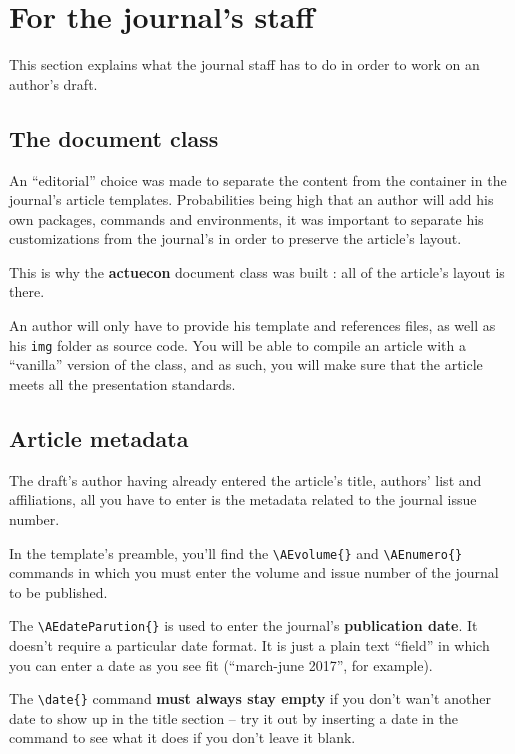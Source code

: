 \documentclass[english]{article}
\newcommand{\cmd}[1]{%
	\texttt{\textbackslash#1\{\}}
}
\begin{document}
	\section{For the journal's staff}
		\label{sec:personnel}
		
		This section explains what the journal staff has to do in order to work on an author's draft.
		
		\subsection{The document class}
		
			An ``editorial'' choice was made to separate the content from the container in the journal's
			article templates. Probabilities being high that an author will add his own packages, commands
			and environments, it was important to separate his customizations from the journal's in order
			to preserve the article's layout.
			
			This is why the \textbf{actuecon} document class was built : all of the article's layout is there.
			
			An author will only have to provide his template and references files, as well as his \texttt{img} folder
			as source code. You will be able to compile an article with a ``vanilla'' version of the class, and as such,
			you will make sure that the article meets all the presentation standards.
			
		\subsection{Article metadata}
		
			The draft's author having already entered the article's title, authors' list and affiliations, all you have
			to enter is the metadata related to the journal issue number.
			
			In the template's preamble, you'll find the \cmd{AEvolume} and \cmd{AEnumero} commands in which you must enter
			the volume and issue number of the journal to be published.
			
			The \cmd{AEdateParution} is used to enter the journal's \textbf{publication date}. It doesn't
			require a particular date format. It is just a plain text ``field'' in which you can enter a date as you see fit
			(``march-june 2017'', for example).
			
			The \cmd{date} command \textbf{must always stay empty} if you don't wan't another date to show up 
			in the title section -- try it out by inserting a date in the command to see what it does if you don't
			leave it blank.
			
\end{document}
